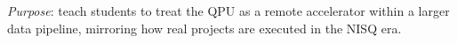 \emph{Purpose}: teach students to treat the QPU as a remote accelerator within 
a larger data pipeline, mirroring how real projects are executed in the NISQ era.








